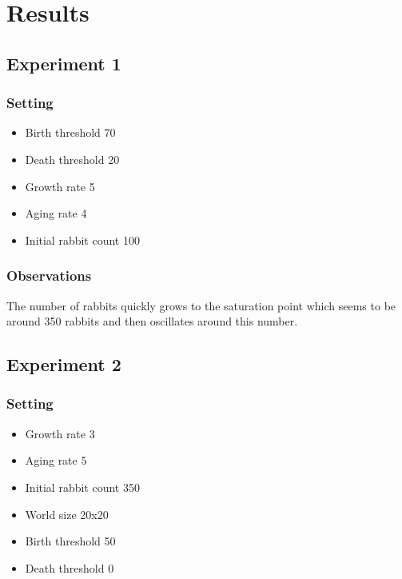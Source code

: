 \documentclass[11pt]{article}
\begin{document}
\section{Results}

\subsection{Experiment 1}

\subsubsection{Setting}

\begin{itemize}
  \item Birth threshold 70
  \item Death threshold 20
  \item Growth rate 5
  \item Aging rate 4
  \item Initial rabbit count 100
\end{itemize}

\subsubsection{Observations}
The number of rabbits quickly grows to the saturation point which
seems to be around 350 rabbits and then oscillates around this
number.

\subsection{Experiment 2}

\subsubsection{Setting}
\begin{itemize}
  \item Growth rate 3
  \item Aging rate 5
  \item Initial rabbit count 350
  \item World size 20x20
  \item Birth threshold 50
  \item Death threshold 0
\end{itemize}
\end{document}

